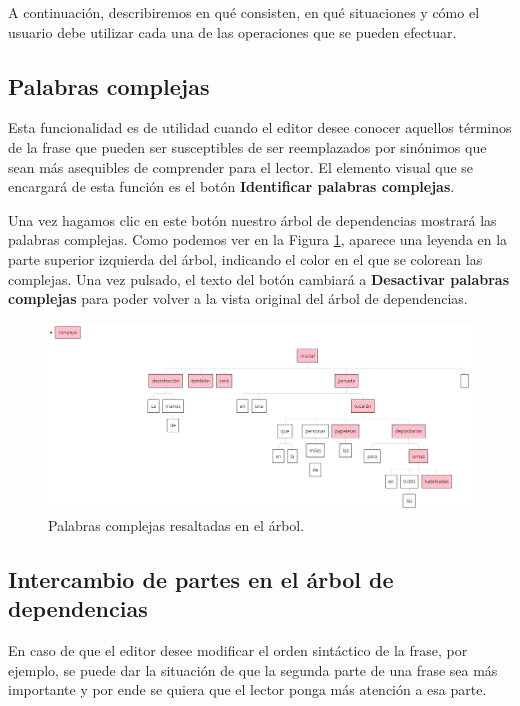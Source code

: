 A continuación, describiremos en qué consisten, en qué situaciones y cómo el usuario debe utilizar cada una de las operaciones que se pueden efectuar.

\subsection{Palabras complejas}
Esta funcionalidad es de utilidad cuando el editor desee conocer aquellos términos de la frase que pueden ser susceptibles de ser reemplazados por sinónimos que sean más asequibles de comprender para el lector. El elemento visual que se encargará de esta función es el botón \textbf{Identificar palabras complejas}.

Una vez hagamos clic en este botón nuestro árbol de dependencias mostrará las palabras complejas. Como podemos ver en la Figura \ref{fig:palabrasComplejas}, aparece una leyenda en la parte superior izquierda del árbol, indicando el color en el que se colorean las complejas. Una vez pulsado, el texto del botón cambiará a \textbf{Desactivar palabras complejas} para poder volver a la vista original del árbol de dependencias.  
	 \begin{figure}[h!]
	\centering
	
	
	\includegraphics[scale=0.55]{Imagenes/Figuras/palabrasComplejas}
	
	
	\caption{Palabras complejas resaltadas en el árbol.}
	\label{fig:palabrasComplejas}
\end{figure}
\subsection{Intercambio de partes en el árbol de dependencias}
En caso de que el editor desee modificar el orden sintáctico de la frase, por ejemplo, se puede dar la situación de que la segunda parte de una frase sea más importante y por ende se quiera que el lector ponga más atención a esa parte. 

